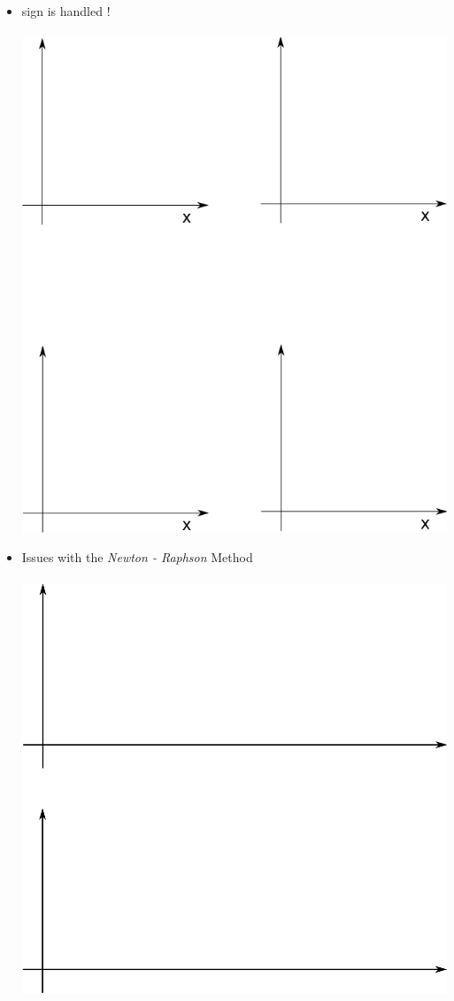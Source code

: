 \documentclass[11pt]{article}
\begin{document}
\begin{itemize}
\begin{itemize}
		\newpage
		\item \LARGE{sign is handled !} \\\\
		\includegraphics[scale=.7]{lecture2_fig4.png}
		
		\newpage
	
		\item \LARGE{Issues with the {\it Newton - Raphson} Method} \\\\
		\includegraphics[scale=.5]{lecture2_fig5.png}


\end{itemize}
\end{itemize}
\end{document}
